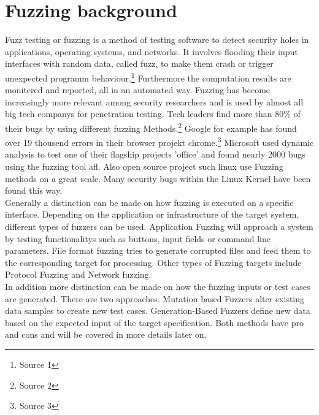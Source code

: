 \documentclass[journal=tosc,final]{iacrtrans}
\begin{document}
\section{Fuzzing background}
Fuzz testing or fuzzing is a method of testing software to detect security holes in applications, operating systems, and networks. It involves flooding their input interfaces with random data, called fuzz, to make them crash or trigger unexpected programm behaviour.\footnote{Source 1} Furthermore the computation results are monitered and reported, all in an automated way. Fuzzing has become increasingly more relevant among security researchers and is used by almost all big tech companys for penetration testing. Tech leaders find more than 80\% of their bugs by using different fuzzing Methods.\footnote{Source 2} Google for example  has found over 19 thousend errors in their browser projekt chrome.\footnote{Source 3} Microsoft used dynamic analysis to test one of their flagship projects 'office' and found nearly 2000 bugs using the fuzzing tool afl. Also open source project such linux use Fuzzing methods on a great scale. Many security bugs within the Linux Kernel have been found this way.\\
Generally a distinction can be made on how fuzzing is executed on a specific interface. Depending on the application or infrastructure of the target system, different types of fuzzers can be used. Application Fuzzing will approach a system by testing functionalitys such as buttons, input fields or command line parameters. File format fuzzing tries to generate corrupted files and feed them to the corresponding target for processing. Other types of Fuzzing targets include Protocol Fuzzing and Network fuzzing.\\
In addition more distinction can be made on how the fuzzing inputs or test cases are generated. There are two approaches. Mutation based Fuzzers alter existing data samples to create new test cases. Generation-Based Fuzzers define new data based on the expected input of the target specification. Both methods have pro and cons and will be covered in more details later on.
\newpage
\end{document}
